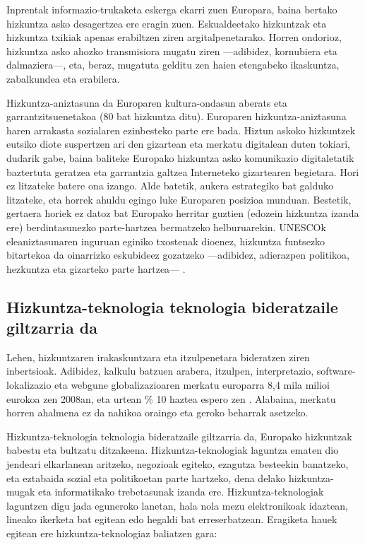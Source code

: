 \begin{multicols}{2}
    Inprentak informazio-trukaketa eskerga ekarri zuen Europara, baina bertako hizkuntza asko desagertzea ere eragin zuen. Eskualdeetako hizkuntzak eta hizkuntza txikiak apenas erabiltzen ziren argitalpenetarako. Horren ondorioz, hizkuntza asko ahozko transmisiora mugatu ziren —adibidez, kornubiera eta dalmaziera—, eta, beraz, mugatuta gelditu zen haien etengabeko ikaskuntza, zabalkundea eta erabilera. 


Hizkuntza-aniztasuna da Europaren kultura-ondasun aberats eta garrantzitsuenetakoa (80 bat hizkuntza ditu). Europaren hizkuntza-aniztasuna haren arrakasta sozialaren ezinbesteko parte ere bada.  Hiztun askoko hizkuntzek eutsiko diote suspertzen ari den gizartean eta merkatu digitalean duten tokiari, dudarik gabe, baina baliteke Europako hizkuntza asko komunikazio digitaletatik baztertuta geratzea eta garrantzia galtzea Interneteko gizartearen begietara. Hori ez litzateke batere ona izango. Alde batetik, aukera estrategiko bat galduko litzateke, eta horrek ahuldu egingo luke Europaren posizioa munduan. Bestetik, gertaera horiek ez datoz bat Europako herritar guztien (edozein hizkuntza izanda ere) berdintasunezko parte-hartzea bermatzeko helburuarekin. UNESCOk eleaniztasunaren inguruan eginiko txostenak dioenez, hizkuntza funtsezko bitartekoa da oinarrizko eskubideez gozatzeko —adibidez, adierazpen politikoa, hezkuntza eta gizarteko parte hartzea— \cite{BAS-Nota3}.

\subsection{Hizkuntza-teknologia teknologia bideratzaile giltzarria da}

   Lehen, hizkuntzaren irakaskuntzara eta itzulpenetara bideratzen ziren inbertsioak. Adibidez, kalkulu batzuen arabera, itzulpen, interpretazio, software-lokalizazio eta webgune globalizazioaren merkatu europarra 8,4 mila milioi eurokoa zen 2008an, eta urtean \% 10 haztea espero zen \cite{BAS-Nota4}. Alabaina, merkatu horren ahalmena ez da nahikoa oraingo eta geroko beharrak asetzeko. 

Hizkuntza-teknologia teknologia bideratzaile giltzarria da, Europako hizkuntzak babestu eta bultzatu ditzakeena. Hizkuntza-teknologiak laguntza ematen dio jendeari elkarlanean aritzeko, negozioak egiteko, ezagutza besteekin banatzeko, eta eztabaida sozial eta politikoetan parte hartzeko, dena delako hizkuntza-mugak eta informatikako trebetasunak izanda ere. Hizkuntza-teknologiak laguntzen digu jada eguneroko lanetan, hala nola mezu elektronikoak idaztean, lineako ikerketa bat egitean edo hegaldi bat erreserbatzean. Eragiketa hauek egitean ere hizkuntza-teknologiaz baliatzen gara:


\end{multicols}
